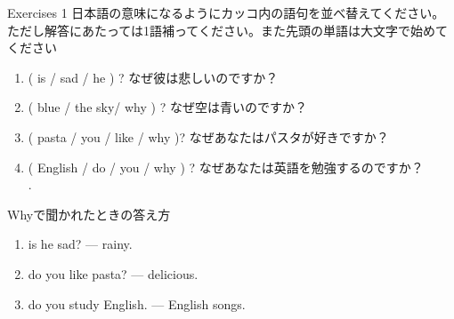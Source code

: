 \documentclass[aspectratio=169,xcolor={dvipsnames,table}]{beamer}
\begin{document}
\begin{frame}[plain]{Exercises 1}
日本語の意味になるようにカッコ内の語句を並べ替えてください。ただし解答にあたっては1語補ってください。また先頭の単語は大文字で始めてください
 \begin{enumerate}
  \item ( is / sad / he ) ? なぜ彼は悲しいのですか？\\
  \item ( blue / the sky/ why ) ? なぜ空は青いのですか？\\
  \item ( pasta / you / like / why )? なぜあなたはパスタが好きですか？\\
  \item ( English / do / you / why ) ? なぜあなたは英語を勉強するのですか？\\
.
 \end{enumerate}

\hfill{}
\end{frame}
\begin{frame}[plain]{Whyで聞かれたときの答え方}
 \begin{enumerate}
  \item {} is he sad? ---   rainy.
  \item {} do you like pasta? ---   delicious.
  \item {} do you study English. ---   English songs.
 \end{enumerate}


\hfill{}
\end{frame}
\end{document}
